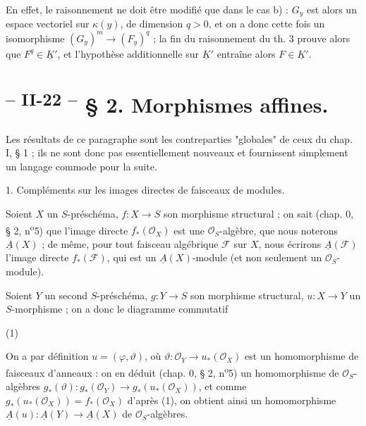 En effet, le raisonnement ne doit être modifié que dans le cas b) : $G_y$ est alors un espace vectoriel sur $\kappa(y)$, de dimension $q > 0$, et on a donc cette fois un isomorphisme $(G_y)^m \to (F_y)^q$ ; la fin du raisonnement du th. 3 prouve alors que $F^q \in \underline{K}'$, et l'hypothèse additionnelle sur $\underline{K}'$ entraîne alors $F \in \underline{K}'$.

\newpage



\setcounter{page}{22}
\section*{\textsuperscript{-- II-22 --} § 2. Morphismes affines.}

Les résultats de ce paragraphe sont les contreparties "globales" de ceux du chap. I, § 1 ; ils ne sont donc pas essentiellement nouveaux et fournissent simplement un langage commode pour la suite.

1. Compléments sur les images directes de faisceaux de modules.

Soient $X$ un $S$-préschéma, $f : X \to S$ son morphisme structural ; on sait (chap. 0, § 2, n\textsuperscript{o}5) que l'image directe $f_*(\mathcal{O}_X)$ est une $\mathcal{O}_S$-algèbre, que nous noterons $\underline{A}(X)$ ; de même, pour tout faisceau algébrique $\mathcal{F}$ sur $X$, nous écrirons $\underline{A}(\mathcal{F})$ l'image directe $f_*(\mathcal{F})$, qui est un $\underline{A}(X)$-module (et non seulement un $\mathcal{O}_S$-module).

Soient $Y$ un second $S$-préschéma, $g : Y \to S$ son morphisme structural, $u : X \to Y$ un $S$-morphisme ; on a donc le diagramme commutatif
\begin{center}
\end{center}
(1)

On a par définition $u = (\varphi, \vartheta)$, où $\vartheta : \mathcal{O}_Y \to u_*(\mathcal{O}_X)$ est un homomorphisme de faisceaux d'anneaux : on en déduit (chap. 0, § 2, n\textsuperscript{o}5) un homomorphisme de $\mathcal{O}_S$-algèbres $g_*(\vartheta) : g_*(\mathcal{O}_Y) \to g_*(u_*(\mathcal{O}_X))$, et comme $g_*(u_*(\mathcal{O}_X)) = f_*(\mathcal{O}_X)$ d'après (1), on obtient ainsi un homomorphisme $\underline{A}(u) : \underline{A}(Y) \to \underline{A}(X)$ de $\mathcal{O}_S$-algèbres.

